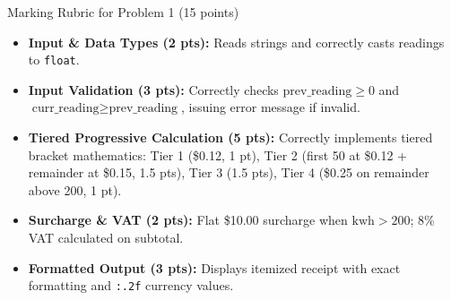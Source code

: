 \documentclass[11pt,a4paper]{article}
\begin{document}
\vspace{0.15cm}
\begin{solbox}{Marking Rubric for Problem 1 (15 points)}
\begin{itemize}[leftmargin=2em, itemsep=1pt]
  \item \textbf{Input \& Data Types (2 pts):} Reads strings and correctly casts readings to \texttt{float}.
  \item \textbf{Input Validation (3 pts):} Correctly checks $\text{prev\_reading} \ge 0$ and $\text{curr\_reading} \ge \text{prev\_reading}$, issuing error message if invalid.
  \item \textbf{Tiered Progressive Calculation (5 pts):} Correctly implements tiered bracket mathematics: Tier 1 (\$0.12, 1 pt), Tier 2 (first 50 at \$0.12 + remainder at \$0.15, 1.5 pts), Tier 3 (1.5 pts), Tier 4 (\$0.25 on remainder above 200, 1 pt).
  \item \textbf{Surcharge \& VAT (2 pts):} Flat \$10.00 surcharge when $\text{kwh} > 200$; 8\% VAT calculated on subtotal.
  \item \textbf{Formatted Output (3 pts):} Displays itemized receipt with exact formatting and \texttt{:.2f} currency values.
\end{itemize}
\end{solbox}

\newpage
\end{document}
